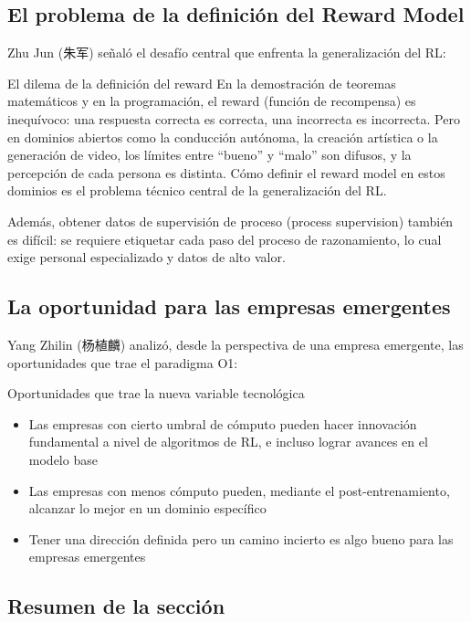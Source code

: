 \documentclass[a4paper]{article}
\begin{document}
\subsection{El problema de la definición del Reward Model}

Zhu Jun (朱军) señaló el desafío central que enfrenta la generalización del RL:

\begin{warningbox}{El dilema de la definición del reward}
En la demostración de teoremas matemáticos y en la programación, el reward (función de recompensa) es inequívoco: una respuesta correcta es correcta, una incorrecta es incorrecta. Pero en dominios abiertos como la conducción autónoma, la creación artística o la generación de video, los límites entre ``bueno'' y ``malo'' son difusos, y la percepción de cada persona es distinta. Cómo definir el reward model en estos dominios es el problema técnico central de la generalización del RL.
\end{warningbox}

Además, obtener datos de supervisión de proceso (process supervision) también es difícil: se requiere etiquetar cada paso del proceso de razonamiento, lo cual exige personal especializado y datos de alto valor.

\subsection{La oportunidad para las empresas emergentes}

Yang Zhilin (杨植麟) analizó, desde la perspectiva de una empresa emergente, las oportunidades que trae el paradigma O1:

\begin{knowledgebox}{Oportunidades que trae la nueva variable tecnológica}
\begin{itemize}
\item Las empresas con cierto umbral de cómputo pueden hacer innovación fundamental a nivel de algoritmos de RL, e incluso lograr avances en el modelo base
\item Las empresas con menos cómputo pueden, mediante el post-entrenamiento, alcanzar lo mejor en un dominio específico
\item Tener una dirección definida pero un camino incierto es algo bueno para las empresas emergentes
\end{itemize}
\end{knowledgebox}

\subsection{Resumen de la sección}
\end{document}
